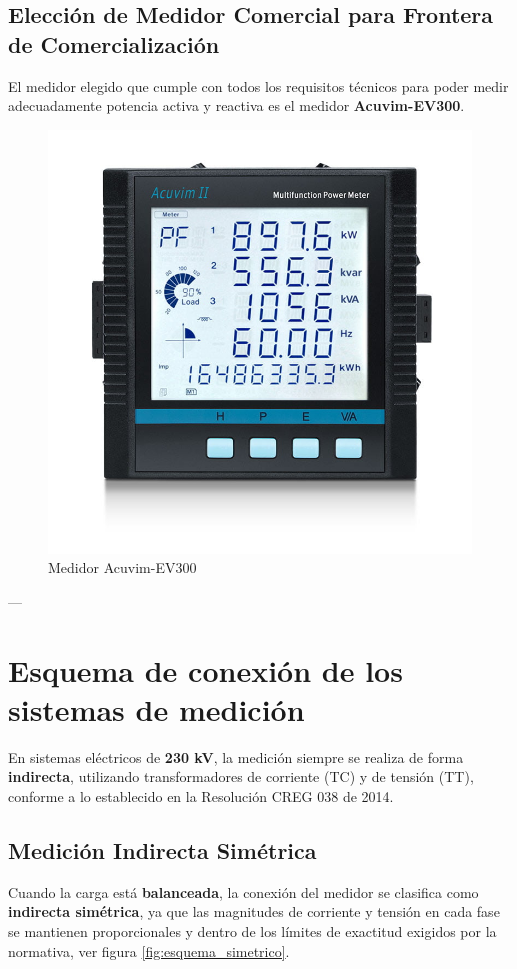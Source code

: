 \subsection{Elección de Medidor Comercial para Frontera de Comercialización}

El medidor elegido que cumple con todos los requisitos técnicos para poder medir adecuadamente potencia activa y reactiva es el medidor \textbf{Acuvim-EV300}.

\begin{figure}[H]
    \centering
    \includegraphics[width=0.8\columnwidth]{figs/Medidor acuvim-EV300.jpg} %
    \caption{Medidor Acuvim-EV300}
    \label{fig:acuvim_ev300}
\end{figure}

---
\section{Esquema de conexión de los sistemas de medición}


En sistemas eléctricos de \textbf{230 kV}, la medición siempre se realiza de forma \textbf{indirecta}, utilizando transformadores de corriente (TC) y de tensión (TT), conforme a lo establecido en la Resolución CREG 038 de 2014.

\subsection{Medición Indirecta Simétrica}

Cuando la carga está \textbf{balanceada}, la conexión del medidor se clasifica como \textbf{indirecta simétrica}, ya que las magnitudes de corriente y tensión en cada fase se mantienen proporcionales y dentro de los límites de exactitud exigidos por la normativa, ver figura \ref{fig:esquema_simetrico}.


